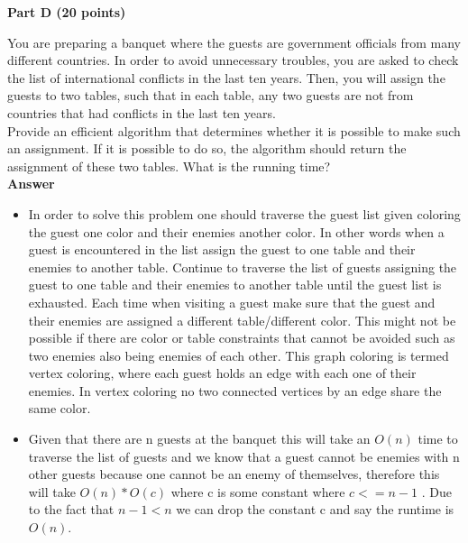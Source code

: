 \documentclass{article}
\begin{document}
\begin{center}
{\bf Part D (20 points)}
\end{center}

 You are preparing a banquet where the
guests are government officials from many different countries. In
order to avoid unnecessary troubles, you are asked to check the list
of international conflicts in the last ten years. Then, you will
assign the guests to two tables, such that in each table, any two
guests are not from countries that had conflicts in the last ten
years.\\

\noindent Provide an efficient algorithm that determines whether it is
possible to make such an assignment. If it is possible to do so, the
algorithm should return the assignment of these two tables. What is
the running time?\\

\textbf{ Answer }
\begin{itemize}
\item In order to solve this problem one should traverse the guest list given coloring the guest one color and their enemies another color. In other words when a guest is encountered in the list assign the guest to one table and their enemies to another table. Continue to traverse the list of guests assigning the guest to one table and their enemies to another table until the guest list is exhausted. Each time when visiting a guest make sure that the guest and their enemies are assigned a different table/different color. This might not be possible if there are color or table constraints that cannot be avoided such as two enemies also being enemies of each other. This graph coloring is termed vertex coloring, where each guest holds an edge with each one of their enemies. In vertex coloring no two connected vertices by an edge share the same color.
\item Given that there are n guests at the banquet this will take an $O(n)$ time to traverse the list of guests and we know that a guest cannot be enemies with n other guests because one cannot be an enemy of themselves, therefore this will take $O(n) * O(c)$ where c is some constant where $c <= n - 1$ . Due to the fact that $n - 1 < n$ we can drop the constant c and say the runtime is $O(n)$.
\end{itemize}
\end{document}
